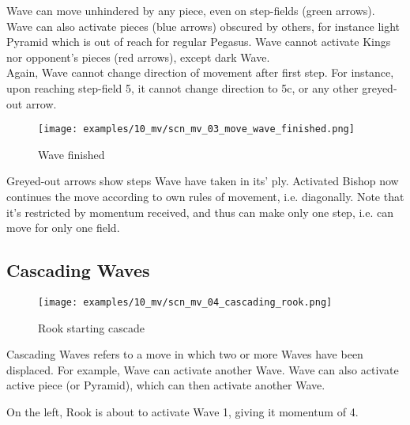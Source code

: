 Wave can move unhindered by any piece, even on step-fields (green arrows). Wave
can also activate pieces (blue arrows) obscured by others, for instance light
Pyramid which is out of reach for regular Pegasus. Wave cannot activate Kings nor
opponent's pieces (red arrows), except dark Wave. \\
Again, Wave cannot change direction of movement after first step. For instance,
upon reaching step-field 5, it cannot change direction to 5c, or any other
greyed-out arrow.

\clearpage %

\noindent
\begin{figure}[h]
\texttt{[image: examples/10\_mv/scn\_mv\_03\_move\_wave\_finished.png]}
\caption{Wave finished}
\label{fig:scn_mv_03_move_wave_finished}
\end{figure}

Greyed-out arrows show steps Wave have taken in its' ply. Activated Bishop
now continues the move according to own rules of movement, i.e. diagonally.
Note that it's restricted by momentum received, and thus can make only one
step, i.e. can move for only one field.

\clearpage %

\subsection*{Cascading Waves}

\noindent
\begin{wrapfigure}[13]{l}{0.5625\textwidth}
\centering
\texttt{[image: examples/10\_mv/scn\_mv\_04\_cascading\_rook.png]}
\caption{Rook starting cascade}
\label{fig:scn_mv_04_cascading_rook}
\end{wrapfigure}
Cascading Waves refers to a move in which two or more Waves have been displaced.
For example, Wave can activate another Wave. Wave can also activate active
piece (or Pyramid), which can then activate another Wave.

On the left, Rook is about to activate Wave 1, giving it momentum of 4.

